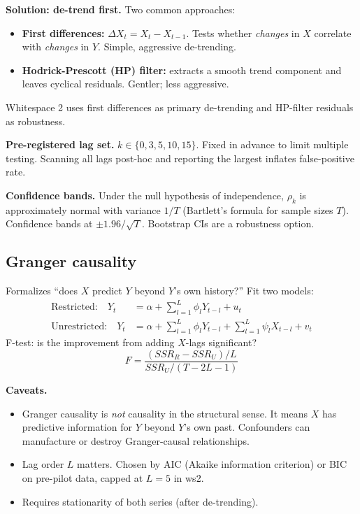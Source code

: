 \documentclass[11pt]{article}
\begin{document}
\textbf{Solution: de-trend first.} Two common approaches:
\begin{itemize}[nosep]
  \item \textbf{First differences:} $\Delta X_t = X_t - X_{t-1}$.
    Tests whether \textit{changes} in $X$ correlate with \textit{changes}
    in $Y$. Simple, aggressive de-trending.
  \item \textbf{Hodrick-Prescott (HP) filter:} extracts a smooth trend
    component and leaves cyclical residuals. Gentler; less aggressive.
\end{itemize}
Whitespace 2 uses first differences as primary de-trending and HP-filter
residuals as robustness.

\textbf{Pre-registered lag set.} $k \in \{0, 3, 5, 10, 15\}$. Fixed in
advance to limit multiple testing. Scanning all lags post-hoc and
reporting the largest inflates false-positive rate.

\textbf{Confidence bands.} Under the null hypothesis of independence,
$\rho_k$ is approximately normal with variance $1/T$ (Bartlett's
formula for sample sizes $T$). Confidence bands at $\pm 1.96/\sqrt{T}$.
Bootstrap CIs are a robustness option.

\subsection{Granger causality}

Formalizes ``does $X$ predict $Y$ beyond $Y$'s own history?''
Fit two models:
\begin{align*}
  \text{Restricted:}\quad Y_t &= \alpha + \sum_{l=1}^{L} \phi_l Y_{t-l}
  + u_t \\
  \text{Unrestricted:}\quad Y_t &= \alpha + \sum_{l=1}^{L} \phi_l Y_{t-l}
  + \sum_{l=1}^{L} \psi_l X_{t-l} + v_t
\end{align*}
F-test: is the improvement from adding $X$-lags significant?
\[
  F = \frac{(SSR_R - SSR_U)/L}{SSR_U/(T - 2L - 1)}
\]

\textbf{Caveats.}
\begin{itemize}[nosep]
  \item Granger causality is \textit{not} causality in the structural
    sense. It means $X$ has predictive information for $Y$ beyond $Y$'s
    own past. Confounders can manufacture or destroy Granger-causal
    relationships.
  \item Lag order $L$ matters. Chosen by AIC (Akaike information
    criterion) or BIC on pre-pilot data, capped at $L = 5$ in ws2.
  \item Requires stationarity of both series (after de-trending).
\end{itemize}
\end{document}
